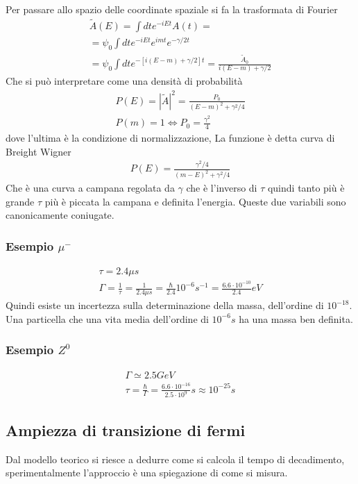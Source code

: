 \documentclass[12pt]{book}
\begin{document}
Per passare allo spazio delle coordinate spaziale si fa la trasformata di Fourier 
\begin{gather}
	\tilde A(E)= \int dt e^{-i Et}A(t) =\\
	= \psi_0 \int dt e^{-iEt} e^{imt} e^{- \gamma/2 t} \\
	= \psi_0 \int dt e^{-[i(E-m)+ \gamma /2]t }= \frac{\tilde A_0}{i(E-m) + \gamma/2}
\end{gather}
Che si può interpretare come una densità di probabilità
\begin{gather}
	P(E) = |\tilde A|^2 = \frac{P_0}{(E-m)^2 + \gamma^2/4}\\
	P(m)=1 \iff P_0 = \frac{\gamma^2}{4}
\end{gather}
dove l'ultima è la condizione di normalizzazione, La funzione è detta curva di Breight Wigner
\begin{gather}
	P(E) = \frac{\gamma^2/4}{(m-E)^2 + \gamma^2/4}
\end{gather}
Che è una curva a campana regolata da $\gamma$ che è l'inverso di $\tau$ quindi tanto più è grande $\tau$ più è piccata la campana e definita l'energia. Queste due variabili sono canonicamente coniugate.

\subsubsection{Esempio $\mu^-$}
\begin{gather}
	\tau = 2.4 \mu s\\
	\Gamma = \frac{1}{\tau}= \frac{1}{2.4 \mu s} = \frac{\hbar}{2.4} 10^{-6}s^{-1} = \frac{6.6 \cdot 10^{-10}}{2.4} eV 
\end{gather}
Quindi esiste un incertezza sulla determinazione della massa, dell'ordine di $10^{-18}$. Una particella che una vita media dell'ordine di $10^{-6}s$ ha una massa ben definita.

\subsubsection{Esempio $Z^0$}
\begin{gather}
	\Gamma \simeq 2.5 GeV\\
	\tau = \frac{\hbar}{\Gamma} = \frac{6.6 \cdot 10^{-16}}{2.5 \cdot 10^9}s \approx 10^{-25}s
\end{gather}

\newpage
\subsection{Ampiezza di transizione di fermi}
Dal modello teorico si riesce a dedurre come si calcola il tempo di decadimento, sperimentalmente l'approccio è una spiegazione di come si misura.
\end{document}

